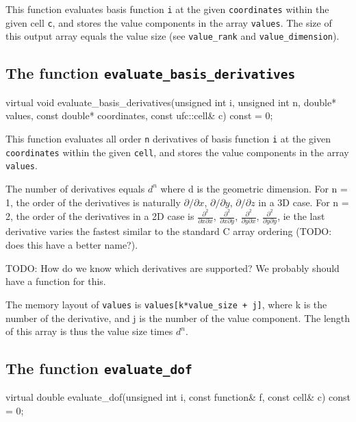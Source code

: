 This function evaluates basis function \texttt{i} at the given \texttt{coordinates}
within the given cell \texttt{c}, and stores the value components in the array \texttt{values}.
The size of this output array equals the value size (see \texttt{value\_rank} and \texttt{value\_dimension}).

\subsection{The function \texttt{evaluate\_basis\_derivatives}}

\begin{code}
virtual void evaluate_basis_derivatives(unsigned int i,
                                        unsigned int n,
                                        double* values,
                                        const double* coordinates,
                                        const ufc::cell& c) const = 0;
\end{code}

This function evaluates all order \texttt{n} derivatives of basis function \texttt{i}
at the given \texttt{coordinates} within the given \texttt{cell},
and stores the value components in the array \texttt{values}.

The number of derivatives equals $d^n$ where d is the geometric dimension.
For n = 1, the order of the derivatives is naturally
$\partial/\partial x$, $\partial/\partial y$, $\partial/\partial z$
in a 3D case.
For n = 2, the order of the derivatives in a 2D case is 
  $\frac{\partial^2}{\partial x\partial x}$,
  $\frac{\partial^2}{\partial x\partial y}$,
  $\frac{\partial^2}{\partial y\partial x}$,
  $\frac{\partial^2}{\partial y\partial y}$,
ie the last derivative varies the fastest similar to the standard C array ordering (TODO: does this have a better name?).

TODO: How do we know which derivatives are supported? We probably should have a function for this.

The memory layout of \texttt{values} is
\texttt{values[k*value\_size + j]},
where k is the number of the derivative,
and j is the number of the value component.
The length of this array is thus the value size times $d^n$.

\subsection{The function \texttt{evaluate\_dof}}

\begin{code}
virtual double evaluate_dof(unsigned int i,
                            const function& f,
                            const cell& c) const = 0;
\end{code}

